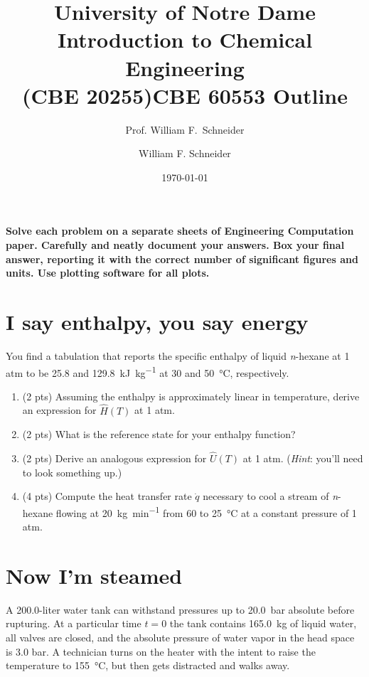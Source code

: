 \documentclass[11pt]{article}
\title{University of Notre Dame\\Introduction to Chemical Engineering\\(CBE 20255)}
\author{Prof. William F.\ Schneider}
\author{William F. Schneider}
\date{\today}
\title{CBE 60553 Outline}
\begin{document}
\begin{options}
\end{options}

\noindent \textbf{Solve each problem on a separate sheets of Engineering Computation paper.  Carefully and neatly document your answers. Box your final answer, reporting it with the correct number of significant figures and units.  Use plotting software for all plots.}


\section{I say enthalpy, you say energy}
\label{sec-1}
You find a tabulation that reports the specific enthalpy of liquid \emph{n}-hexane at 1 atm to be 25.8 and \SI{129.8}{\kilo\joule\per\kilo\gram} at 30 and \SI{50}{\celsius}, respectively.
\begin{enumerate}
\item (2 pts) Assuming the enthalpy is approximately linear in temperature, derive an expression for \(\hat{H}(T)\) at 1 atm.
\item (2 pts) What is the reference state for your enthalpy function?
\item (2 pts) Derive an analogous expression for \(\hat{U}(T)\) at 1 atm.  (\emph{Hint}: you'll need to look something up.)
\item (4 pts)  Compute the heat transfer rate \(\dot{q}\) necessary to cool a stream of \emph{n}-hexane flowing at \SI{20}{\kilo\gram\per\minute} from 60 to \SI{25}{\celsius} at a constant pressure of 1 atm.
\end{enumerate}

\section{Now I'm steamed}
\label{sec-2}
A 200.0-liter water tank can withstand pressures up to \SI{20.0}{\bar} absolute before rupturing.  At a particular time \(t = 0\) the tank contains \SI{165.0}{\kilo\gram} of liquid water, all valves are closed, and the absolute pressure of water vapor in the head space is 3.0 bar.  A technician turns on the heater with the intent to raise the temperature to \SI{155}{\celsius}, but then gets distracted and walks away.
\end{document}
